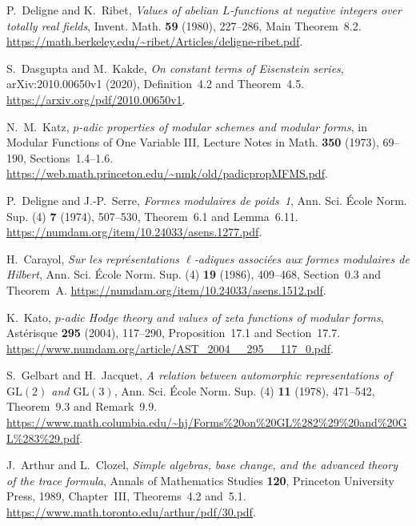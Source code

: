 P.~Deligne and K.~Ribet,
\emph{Values of abelian \(L\)-functions at negative integers over
totally real fields}, Invent. Math. \textbf{59} (1980), 227--286,
Main Theorem~8.2.
\url{https://math.berkeley.edu/~ribet/Articles/deligne-ribet.pdf}.

S.~Dasgupta and M.~Kakde,
\emph{On constant terms of Eisenstein series},
arXiv:2010.00650v1 (2020), Definition~4.2 and Theorem~4.5.
\url{https://arxiv.org/pdf/2010.00650v1}.

N.~M.~Katz,
\emph{\(p\)-adic properties of modular schemes and modular forms},
in Modular Functions of One Variable III,
Lecture Notes in Math. \textbf{350} (1973), 69--190,
Sections~1.4--1.6.
\url{https://web.math.princeton.edu/~nmk/old/padicpropMFMS.pdf}.

P.~Deligne and J.-P.~Serre,
\emph{Formes modulaires de poids~1},
Ann. Sci. \'Ecole Norm. Sup. (4) \textbf{7} (1974), 507--530,
Theorem~6.1 and Lemma~6.11.
\url{https://numdam.org/item/10.24033/asens.1277.pdf}.

H.~Carayol,
\emph{Sur les repr\'esentations \(\ell\)-adiques associ\'ees aux formes
modulaires de Hilbert},
Ann. Sci. \'Ecole Norm. Sup. (4) \textbf{19} (1986), 409--468,
Section~0.3 and Theorem~A.
\url{https://numdam.org/item/10.24033/asens.1512.pdf}.

K.~Kato,
\emph{\(p\)-adic Hodge theory and values of zeta functions of modular
forms}, Ast\'erisque \textbf{295} (2004), 117--290,
Proposition~17.1 and Section~17.7.
\url{https://www.numdam.org/article/AST_2004__295__117_0.pdf}.

S.~Gelbart and H.~Jacquet,
\emph{A relation between automorphic representations of
\(\mathrm{GL}(2)\) and \(\mathrm{GL}(3)\)},
Ann. Sci. \'Ecole Norm. Sup. (4) \textbf{11} (1978), 471--542,
Theorem~9.3 and Remark~9.9.
\url{https://www.math.columbia.edu/~hj/Forms%20on%20GL%282%29%20and%20GL%283%29.pdf}.

J.~Arthur and L.~Clozel,
\emph{Simple algebras, base change, and the advanced theory of the trace
formula}, Annals of Mathematics Studies \textbf{120}, Princeton
University Press, 1989, Chapter~III, Theorems~4.2 and~5.1.
\url{https://www.math.toronto.edu/arthur/pdf/30.pdf}.
